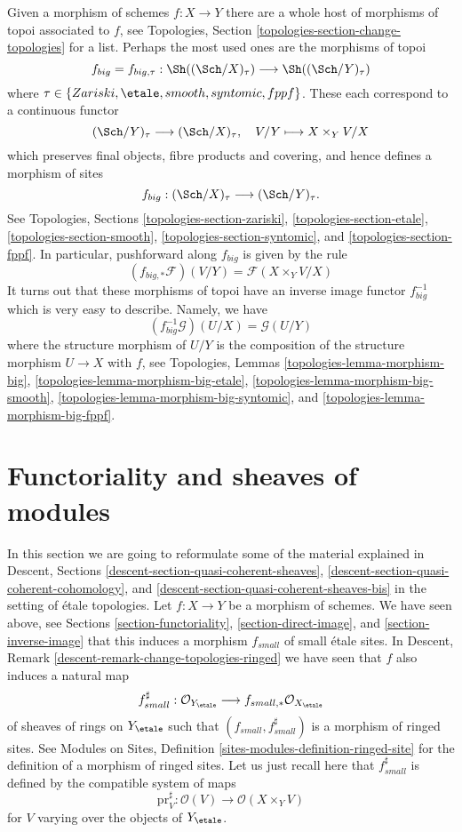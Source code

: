 \noindent
Given a morphism of schemes $f : X \to Y$ there are a whole host of
morphisms of topoi associated to $f$, see
Topologies, Section \ref{topologies-section-change-topologies}
for a list. Perhaps the most used ones are the morphisms of topoi
$$
f_{big} = f_{big, \tau} :
\Sh((\Sch/X)_\tau)
\longrightarrow
\Sh((\Sch/Y)_\tau)
$$
where $\tau \in \{Zariski, \etale, smooth, syntomic, fppf\}$.
These each correspond to a continuous functor
$$
(\Sch/Y)_\tau \longrightarrow (\Sch/X)_\tau, \quad
V/Y \longmapsto X \times_Y V/X
$$
which preserves final objects, fibre products and covering, and hence
defines a morphism of sites
$$
f_{big} : (\Sch/X)_\tau \longrightarrow (\Sch/Y)_\tau.
$$
See
Topologies, Sections \ref{topologies-section-zariski},
\ref{topologies-section-etale},
\ref{topologies-section-smooth},
\ref{topologies-section-syntomic}, and
\ref{topologies-section-fppf}.
In particular, pushforward along $f_{big}$ is given by the rule
$$
(f_{big, *}\mathcal{F})(V/Y) = \mathcal{F}(X \times_Y V/X)
$$
It turns out that these morphisms of topoi have an inverse
image functor $f_{big}^{-1}$ which is very easy to describe.
Namely, we have
$$
(f_{big}^{-1}\mathcal{G})(U/X) = \mathcal{G}(U/Y)
$$
where the structure morphism of $U/Y$ is the composition of the
structure morphism $U \to X$ with $f$, see
Topologies, Lemmas \ref{topologies-lemma-morphism-big},
\ref{topologies-lemma-morphism-big-etale},
\ref{topologies-lemma-morphism-big-smooth},
\ref{topologies-lemma-morphism-big-syntomic}, and
\ref{topologies-lemma-morphism-big-fppf}.







\section{Functoriality and sheaves of modules}
\label{section-morphisms-modules}

\noindent
In this section we are going to reformulate some of the material explained in
Descent, Sections \ref{descent-section-quasi-coherent-sheaves},
\ref{descent-section-quasi-coherent-cohomology}, and
\ref{descent-section-quasi-coherent-sheaves-bis}
in the setting of \'etale topologies. Let $f : X \to Y$ be a morphism of
schemes. We have seen above, see
Sections \ref{section-functoriality}, \ref{section-direct-image}, and
\ref{section-inverse-image}
that this induces a morphism $f_{small}$ of small \'etale sites. In
Descent, Remark \ref{descent-remark-change-topologies-ringed}
we have seen that $f$ also induces a natural map
$$
f_{small}^\sharp :
\mathcal{O}_{Y_\etale}
\longrightarrow
f_{small, *}\mathcal{O}_{X_\etale}
$$
of sheaves of rings on
$Y_\etale$ such that $(f_{small}, f_{small}^\sharp)$
is a morphism of ringed sites. See
Modules on Sites, Definition \ref{sites-modules-definition-ringed-site}
for the definition of a morphism of ringed sites.
Let us just recall here that $f_{small}^\sharp$ is defined by the
compatible system of maps
$$
\text{pr}_V^\sharp : \mathcal{O}(V) \longrightarrow \mathcal{O}(X \times_Y V)
$$
for $V$ varying over the objects of $Y_\etale$.

